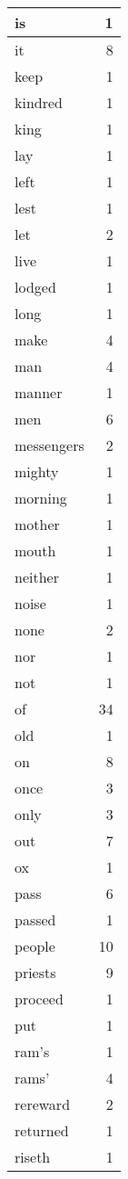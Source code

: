 \begin{center}
\begin{longtable}{l|r}
is & 1 \\ \hline
it & 8 \\ \hline
keep & 1 \\ \hline
kindred & 1 \\ \hline
king & 1 \\ \hline
lay & 1 \\ \hline
left & 1 \\ \hline
lest & 1 \\ \hline
let & 2 \\ \hline
live & 1 \\ \hline
lodged & 1 \\ \hline
long & 1 \\ \hline
make & 4 \\ \hline
man & 4 \\ \hline
manner & 1 \\ \hline
men & 6 \\ \hline
messengers & 2 \\ \hline
mighty & 1 \\ \hline
morning & 1 \\ \hline
mother & 1 \\ \hline
mouth & 1 \\ \hline
neither & 1 \\ \hline
noise & 1 \\ \hline
none & 2 \\ \hline
nor & 1 \\ \hline
not & 1 \\ \hline
of & 34 \\ \hline
old & 1 \\ \hline
on & 8 \\ \hline
once & 3 \\ \hline
only & 3 \\ \hline
out & 7 \\ \hline
ox & 1 \\ \hline
pass & 6 \\ \hline
passed & 1 \\ \hline
people & 10 \\ \hline
priests & 9 \\ \hline
proceed & 1 \\ \hline
put & 1 \\ \hline
ram's & 1 \\ \hline
rams' & 4 \\ \hline
rereward & 2 \\ \hline
returned & 1 \\ \hline
riseth & 1 \\ \hline

\end{longtable}
\end{center}
